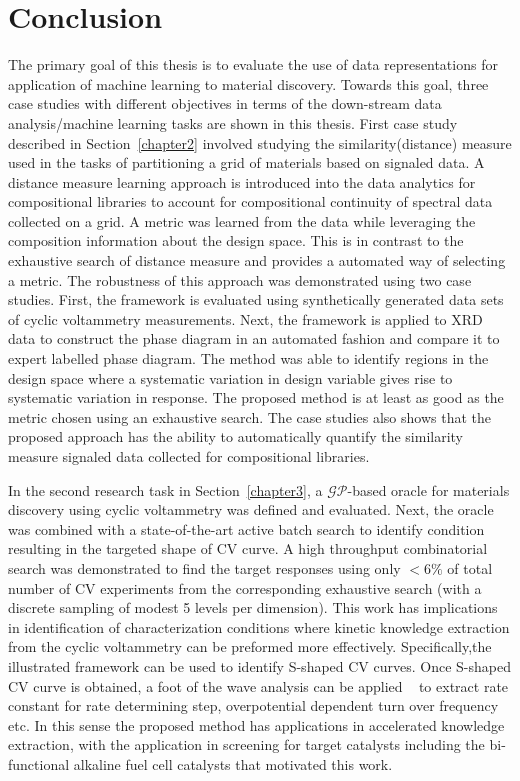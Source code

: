 \chapter{Conclusion}\label{Chapter 5}
The primary goal of this thesis is to evaluate the use of data representations for application of machine learning to material discovery.
Towards this goal, three case studies with different objectives in terms of the down-stream data analysis/machine learning tasks are shown in this thesis. 
First case study described in Section~\ref{chapter2} involved studying the similarity(distance) measure used in the tasks of partitioning a grid of materials based on signaled data.
A distance measure learning approach is introduced into the data analytics for compositional libraries to account for compositional continuity of spectral data collected on a grid. 
A metric was learned from the data while leveraging the composition information about the design space. 
This is in contrast to the exhaustive search of distance measure and provides a automated way of selecting a metric.
The robustness of this approach was demonstrated using two case studies. 
First, the framework is evaluated using synthetically generated data sets of cyclic voltammetry measurements. 
Next, the framework is applied to XRD data to construct the phase diagram in an automated fashion and compare it to expert labelled phase diagram.
The method was able to identify regions in the design space where a systematic variation in design variable gives rise to systematic variation in response.
The proposed method is at least as good as the metric chosen using an exhaustive search.
The case studies also shows that the proposed approach has the ability to automatically quantify the similarity measure signaled data collected for compositional libraries. 


In the second research task in Section~\ref{chapter3}, a \(\mathcal{GP}\)-based oracle for materials discovery using cyclic voltammetry was defined and evaluated.
Next, the oracle was combined with a state-of-the-art active batch search to identify condition resulting in the targeted shape of CV curve. 
A high throughput combinatorial search was demonstrated to find the target responses using only \(<6\%\) of total number of CV experiments from the corresponding exhaustive search (with a discrete sampling of modest 5 levels per dimension). 
This work has implications in identification of characterization conditions where kinetic knowledge extraction from the cyclic voltammetry can be preformed more effectively. 
Specifically,the illustrated framework can be used to identify S-shaped CV curves. 
Once S-shaped CV curve is obtained, a foot of the wave analysis can be applied ~\cite{FOWA} to extract rate constant for rate determining step, overpotential dependent turn over frequency etc.
In this sense the proposed method has applications in accelerated knowledge extraction, with the application in screening for target catalysts including the bi-functional alkaline fuel cell catalysts that motivated this work.


